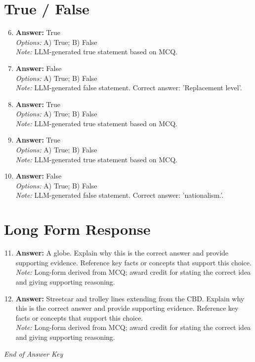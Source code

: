 \documentclass[12pt]{article}
\begin{document}
\section*{True / False}
\begin{enumerate}[label=\arabic*.]
\setcounter{enumi}{5}
\item \textbf{Answer:} True
\\ \textit{Options:} A) True; B) False
\\ \textit{Note:} LLM-generated true statement based on MCQ.
\item \textbf{Answer:} False
\\ \textit{Options:} A) True; B) False
\\ \textit{Note:} LLM-generated false statement. Correct answer: 'Replacement level'.
\item \textbf{Answer:} True
\\ \textit{Options:} A) True; B) False
\\ \textit{Note:} LLM-generated true statement based on MCQ.
\item \textbf{Answer:} True
\\ \textit{Options:} A) True; B) False
\\ \textit{Note:} LLM-generated true statement based on MCQ.
\item \textbf{Answer:} False
\\ \textit{Options:} A) True; B) False
\\ \textit{Note:} LLM-generated false statement. Correct answer: 'nationalism.'.
\end{enumerate}

\section*{Long Form Response}
\begin{enumerate}[label=\arabic*.]
\setcounter{enumi}{10}
\item \textbf{Answer:} A globe. Explain why this is the correct answer and provide supporting evidence. Reference key facts or concepts that support this choice.
\\ \textit{Note:} Long-form derived from MCQ; award credit for stating the correct idea and giving supporting reasoning.
\item \textbf{Answer:} Streetcar and trolley lines extending from the CBD. Explain why this is the correct answer and provide supporting evidence. Reference key facts or concepts that support this choice.
\\ \textit{Note:} Long-form derived from MCQ; award credit for stating the correct idea and giving supporting reasoning.
\end{enumerate}

\vfill
\noindent\textit{End of Answer Key}
\end{document}
